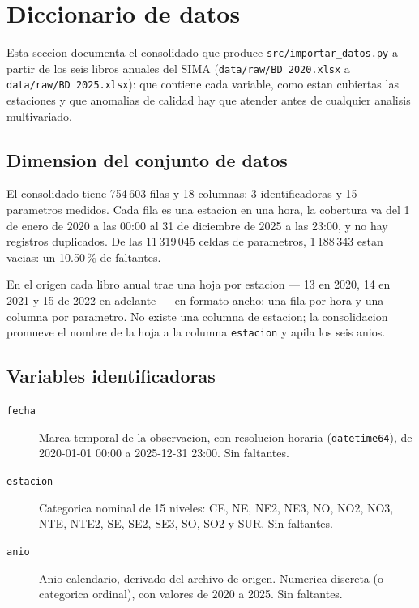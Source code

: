 \section{Diccionario de datos}\label{sec:diccionario}

Esta seccion documenta el consolidado que produce
\texttt{src/importar\_datos.py} a partir de los seis libros anuales del SIMA
(\texttt{data/raw/BD 2020.xlsx} a \texttt{data/raw/BD 2025.xlsx}): que contiene
cada variable, como estan cubiertas las estaciones y que anomalias de calidad
hay que atender antes de cualquier analisis multivariado.

\subsection{Dimension del conjunto de datos}\label{sec:dic:dimension}

El consolidado tiene 754\,603 filas y 18 columnas: 3 identificadoras y 15
parametros medidos. Cada fila es una estacion en una hora, la cobertura va del
1 de enero de 2020 a las 00:00 al 31 de diciembre de 2025 a las 23:00, y no hay
registros duplicados. De las 11\,319\,045 celdas de parametros, 1\,188\,343
estan vacias: un 10.50\,\% de faltantes.

En el origen cada libro anual trae una hoja por estacion --- 13 en 2020, 14 en
2021 y 15 de 2022 en adelante --- en formato ancho: una fila por hora y una
columna por parametro. No existe una columna de estacion; la consolidacion
promueve el nombre de la hoja a la columna \texttt{estacion} y apila los seis
anios.

\subsection{Variables identificadoras}\label{sec:dic:identificadoras}

\begin{description}
  \item[\texttt{fecha}] Marca temporal de la observacion, con resolucion
    horaria (\texttt{datetime64}), de 2020-01-01 00:00 a 2025-12-31 23:00. Sin
    faltantes.
  \item[\texttt{estacion}] Categorica nominal de 15 niveles: CE, NE, NE2, NE3,
    NO, NO2, NO3, NTE, NTE2, SE, SE2, SE3, SO, SO2 y SUR. Sin faltantes.
  \item[\texttt{anio}] Anio calendario, derivado del archivo de origen.
    Numerica discreta (o categorica ordinal), con valores de 2020 a 2025. Sin
    faltantes.
\end{description}

